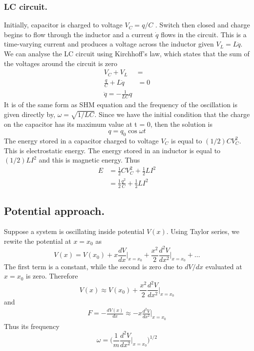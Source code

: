 \documentclass[../../main.tex]{subfiles}
\begin{document}
\subsubsection{LC circuit.} Initially, capacitor is charged to voltage $V_C=q/C$ . Switch then closed and  charge begins to flow through the inductor and a current $\dot{q}$ flows in the circuit. This is a time-varying current and produces a voltage across the inductor given $V_L=L\ddot{q}$. We can analyse the LC circuit using Kirchhoff's law, which states that the sum of the voltages around the circuit is zero
\begin{align*}
    V_C+V_L&=\\
    \frac{q}{C}+L\ddot{q}&=0\\
    \ddot{q}=-\frac{1}{LC}q
\end{align*}
It is of the same form as SHM equation and the frequency of the oscillation is given directly by, $\omega = \sqrt{1/LC}$. Since we have the initial condition that the charge on the capacitor has its maximum value at t = 0, then the solution is
\begin{equation*}
    q=q_0\cos\omega t
\end{equation*}
The energy stored in a capacitor charged to voltage $V_C$ is equal to $(1/2) CV_C^2$. This is electrostatic energy. The energy stored in an inductor is equal to $(1/2) LI^2$ and this is magnetic energy. Thus \begin{align*}
    E&=\frac{1}{2}CV_C^2+\frac{1}{2}LI^2\\
    &=\frac{1}{2}\frac{q^2}{C}+\frac{1}{2}LI^2
\end{align*}

\subsection{Potential approach.} Suppose a system is oscillating inside potential $V(x)$. Using Taylor series, we rewite the potential at $x=x_0$ as
\begin{equation*}
    V(x)=V(x_0)+x\frac{dV}{dx}\bigg|_{x=x_0}+\frac{x^2}{2}\frac{d^2V}{dx^2}\bigg|_{x=x_0}+\dots
\end{equation*}
The first term is a constant, while the second is zero due to $dV/dx$ evaluated at $x=x_0$ is zero. Therefore 
\begin{equation*}
    V(x)\approx V(x_0)+\frac{x^2}{2}\frac{d^2V}{dx^2}\bigg|_{x=x_0}
\end{equation*}
and 
\begin{align*}
    F=-\frac{dV(x)}{dx}\approx-x\frac{d^2V}{dx^2}\bigg|_{x=x_0}
\end{align*}
Thus its frequency
\begin{equation*}
    \omega=\biggl(\frac{1}{m}\frac{d^2V}{dx^2}\bigg|_{x=x_0}\biggr)^{1/2}
\end{equation*} 
\end{document}
